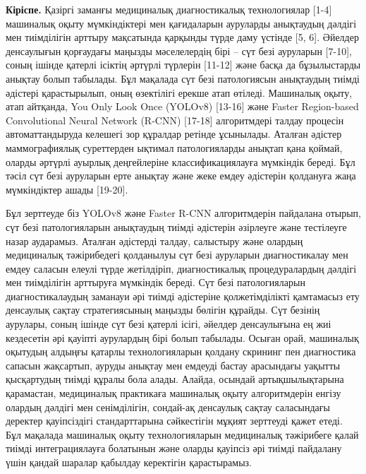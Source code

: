 \begin{multicols}{2}
{\bfseries Кіріспе.} Қазіргі заманғы медициналық диагностикалық
технологиялар {[}1-4{]} машиналық оқыту мүмкіндіктері мен қағидаларын
ауруларды анықтаудың дәлдігі мен тиімділігін арттыру мақсатында қарқынды
түрде даму үстінде {[}5, 6{]}. Әйелдер денсаулығын қорғаудағы маңызды
мәселелердің бірі -- сүт безі ауруларын {[}7-10{]}, соның ішінде қатерлі
ісіктің әртүрлі түрлерін {[}11-12{]} және басқа да бұзылыстарды анықтау
болып табылады. Бұл мақалада сүт безі патологиясын анықтаудың тиімді
әдістері қарастырылып, оның өзектілігі ерекше атап өтіледі. Машиналық
оқыту, атап айтқанда, You Only Look Once (YOLOv8) {[}13-16{]} және
Faster Region-based Convolutional Neural Network (R-CNN) {[}17-18{]}
алгоритмдері талдау процесін автоматтандыруда келешегі зор құралдар
ретінде ұсынылады. Аталған әдістер маммографиялық суреттерден ықтимал
патологияларды анықтап қана қоймай, оларды әртүрлі ауырлық деңгейлеріне
классификациялауға мүмкіндік береді. Бұл тәсіл сүт безі ауруларын ерте
анықтау және жеке емдеу әдістерін қолдануға жаңа мүмкіндіктер ашады
{[}19-20{]}.

Бұл зерттеуде біз YOLOv8 және Faster R-CNN алгоритмдерін пайдалана
отырып, сүт безі патологияларын анықтаудың тиімді әдістерін әзірлеуге
және тестілеуге назар аударамыз. Аталған әдістерді талдау, салыстыру
және олардың медициналық тәжірибедегі қолданылуы сүт безі ауруларын
диагностикалау мен емдеу саласын елеулі түрде жетілдіріп, диагностикалық
процедуралардың дәлдігі мен тиімділігін арттыруға мүмкіндік береді. Сүт
безі патологияларын диагностикалаудың заманауи әрі тиімді әдістеріне
қолжетімділікті қамтамасыз ету денсаулық сақтау стратегиясының маңызды
бөлігін құрайды. Сүт безінің аурулары, соның ішінде сүт безі қатерлі
ісігі, әйелдер денсаулығына ең жиі кездесетін әрі қауіпті аурулардың
бірі болып табылады. Осыған орай, машиналық оқытудың алдыңғы қатарлы
технологияларын қолдану скрининг пен диагностика сапасын жақсартып,
ауруды анықтау мен емдеуді бастау арасындағы уақытты қысқартудың тиімді
құралы бола алады. Алайда, осындай артықшылықтарына қарамастан,
медициналық практикаға машиналық оқыту алгоритмдерін енгізу олардың
дәлдігі мен сенімділігін, сондай-ақ денсаулық сақтау саласындағы
деректер қауіпсіздігі стандарттарына сәйкестігін мұқият зерттеуді қажет
етеді. Бұл мақалада машиналық оқыту технологияларын медициналық
тәжірибеге қалай тиімді интеграциялауға болатынын және оларды қауіпсіз
әрі тиімді пайдалану үшін қандай шаралар қабылдау керектігін
қарастырамыз.


\end{multicols}
